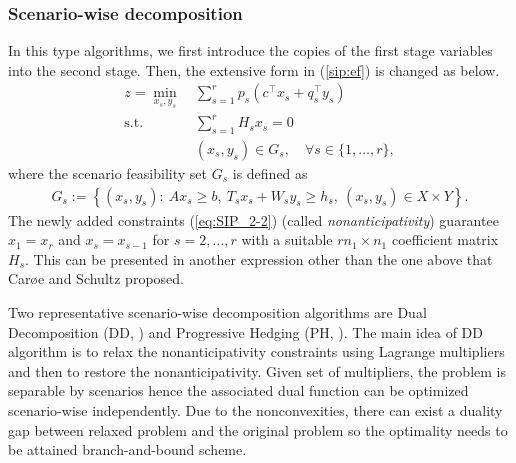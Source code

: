 \subsubsection{Scenario-wise decomposition}
In this type algorithms, we first introduce the copies of the first stage variables into the second stage. Then, the extensive form in (\ref{sip:ef}) is changed as below.
\begin{subequations}
	\begin{align}
	z=\min_{x_s,y_s}\ &\sum_{s=1}^{r}p_s\left(c^{\top}x_s+q_s^{\top}y_s\right)	\label{eq:SIP_2-1}\\ 
	\mathrm{s.t.}\ &\sum_{s=1}^{r}H_s x_s=0 \label{eq:SIP_2-2} \\
	\ &(x_s,y_s)\in G_s,\quad \forall s\in\{1,\ldots,r\},	\label{eq:SIP_2-3}
	\end{align}
\end{subequations}
where the scenario feasibility set $G_s$ is defined as
\begin{align}
G_s:=\left\{ (x_s,y_s): \ Ax_s\ge b,\  T_s x_s+W_s y_s\ge h_s,\ (x_s,y_s)\in X\times Y  \right\}. \label{eq:SIP_2-4}
\end{align}
The newly added constraints (\ref{eq:SIP_2-2}) (called \textit{nonanticipativity}) guarantee $x_1=x_r$ and $x_s=x_{s-1}$ for $s=2,\ldots,r$ with a suitable $rn_1\times n_1$ coefficient matrix $H_s$. This can be presented in another expression other than the one above that Car\o e and Schultz \cite{CS1999} proposed.

Two representative scenario-wise decomposition algorithms are Dual Decomposition (DD, \cite{CS1999}) and Progressive Hedging (PH, \cite{RW1991}). The main idea of DD algorithm is to relax the nonanticipativity constraints using Lagrange multipliers and then to restore the nonanticipativity. Given set of multipliers, the problem is separable by scenarios hence the associated dual function can be optimized scenario-wise independently. Due to the nonconvexities, there can exist a duality gap between relaxed problem and the original problem so the optimality needs to be attained branch-and-bound scheme.

